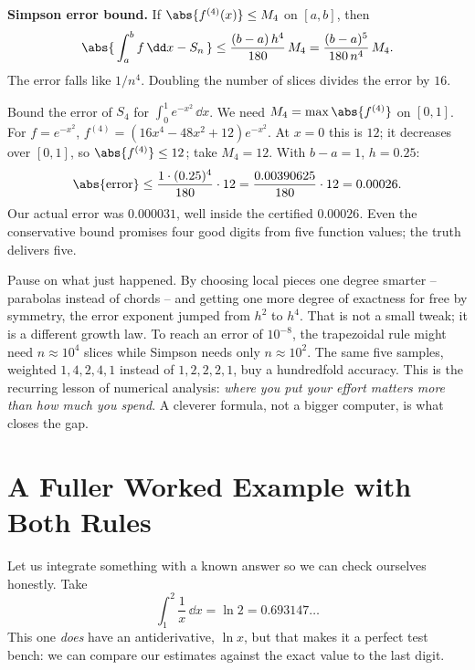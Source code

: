 \begin{focusbox}
\textbf{Simpson error bound.} If $\abs{f^{(4)}(x)} \le M_4$ on $[a,b]$, then
\[
\abs{\,\int_a^b f\,\dd x - S_n\,} \le \frac{(b-a)\,h^4}{180}\,M_4 = \frac{(b-a)^5}{180\,n^4}\,M_4.
\]
The error falls like $1/n^4$. Doubling the number of slices divides the error by $16$.
\end{focusbox}

\begin{labbox}
Bound the error of $S_4$ for $\int_0^1 e^{-x^2}\,\dd x$. We need $M_4 = \max\abs{f^{(4)}}$ on $[0,1]$. For $f = e^{-x^2}$, $f^{(4)} = (16x^4 - 48x^2 + 12)e^{-x^2}$. At $x = 0$ this is $12$; it decreases over $[0,1]$, so $\abs{f^{(4)}} \le 12$; take $M_4 = 12$. With $b-a=1$, $h=0.25$:
\[
\abs{\text{error}} \le \frac{1\cdot (0.25)^4}{180}\cdot 12 = \frac{0.00390625}{180}\cdot 12 = 0.00026.
\]
Our actual error was $0.000031$, well inside the certified $0.00026$. Even the conservative bound promises four good digits from five function values; the truth delivers five.
\end{labbox}

\begin{aestheticbox}
Pause on what just happened. By choosing local pieces one degree smarter -- parabolas instead of chords -- and getting one more degree of exactness for free by symmetry, the error exponent jumped from $h^2$ to $h^4$. That is not a small tweak; it is a different growth law. To reach an error of $10^{-8}$, the trapezoidal rule might need $n \approx 10^4$ slices while Simpson needs only $n \approx 10^2$. The same five samples, weighted $1,4,2,4,1$ instead of $1,2,2,2,1$, buy a hundredfold accuracy. This is the recurring lesson of numerical analysis: \emph{where you put your effort matters more than how much you spend}. A cleverer formula, not a bigger computer, is what closes the gap.
\end{aestheticbox}

\section{A Fuller Worked Example with Both Rules}
\label{ch27:worked}

Let us integrate something with a known answer so we can check ourselves honestly. Take
\[
\int_1^2 \frac{1}{x}\,\dd x = \ln 2 = 0.693147\ldots
\]
This one \emph{does} have an antiderivative, $\ln x$, but that makes it a perfect test bench: we can compare our estimates against the exact value to the last digit.


